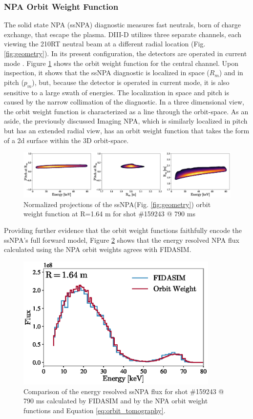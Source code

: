 \subsubsection{NPA Orbit Weight Function}
The solid state NPA (ssNPA) diagnostic measures fast neutrals, born of charge exchange, that escape the plasma. DIII-D utilizes three separate channels, each viewing the 210RT neutral beam at a different radial location (Fig. \ref{fig:geometry}). In its present configuration, the detectors are operated in current mode \cite{ssNPA2012}.
Figure \ref{fig:npa_orbit_weight} shows the orbit weight function for the central channel. Upon inspection, it shows that the ssNPA diagnostic is localized in space ($R_m$) and in pitch ($p_m$), but, because the detector is operated in current mode, it is also sensitive to a large swath of energies. The localization in space and pitch is caused by the narrow collimation of the diagnostic. In a three dimensional view, the orbit weight function is characterized as a line through the orbit-space. As an aside, the previously discussed Imaging NPA\cite{du2018inpa}, which is similarly localized in pitch but has an extended radial view, has an orbit weight function that takes the form of a 2d surface within the 3D orbit-space.
\begin{figure}[h!]
    \centering
    \includegraphics[width=15cm]{figures/npa_orbit_weight_2.eps}
    \caption{Normalized projections of the ssNPA(Fig. \ref{fig:geometry}) orbit weight function at R=1.64 m for shot \#159243 @ 790 ms}
    \label{fig:npa_orbit_weight}
\end{figure}

Providing further evidence that the orbit weight functions faithfully encode the ssNPA's full forward model, Figure \ref{fig:npa_ow_flux} shows that the energy resolved NPA flux calculated using the NPA orbit weights agrees with FIDASIM. 
\begin{figure}[h!]
    \centering
    \includegraphics[width=10cm]{figures/npa_flux.eps}
    \caption{Comparison of the energy resolved ssNPA flux for shot \#159243 @ 790 ms calculated by FIDASIM and by the NPA orbit weight functions and Equation \ref{eq:orbit_tomography}.}
    \label{fig:npa_ow_flux}
\end{figure}

